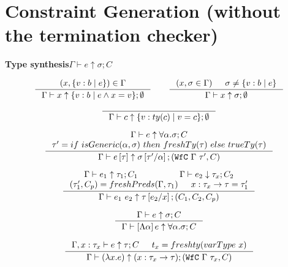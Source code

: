 \renewcommand\hastype[4]{\ensuremath{#1 \vdash #2 \uparrow #3 ; #4}}
\newcommand\checktype[4]{\ensuremath{#1 \vdash #2 \downarrow #3 ; #4}}
\newcommand\hastypealt[5]{\ensuremath{#1 ; #2 \downarrow #3 \colon #4 ; #5}}
\newcommand\ty[1]{\ensuremath{ty(#1)}}


\section*{Constraint Generation (without the termination checker)}

\hfill\textbf{Type synthesis}\qquad\mbox{\hastype{\Gamma}{e}{\sigma}{C}}


$$
\inference{
	(x, \tref{v}{b}{e}) \in \Gamma
}{
	\hastype{\Gamma}{x}{\tref{v}{b}{e \land x = v}}{\emptyset}
}
\qquad
\inference{
	(x, \sigma \in \Gamma) &&
	\sigma \neq \tref{v}{b}{e}
}{
	\hastype{\Gamma}{x}{\sigma}{\emptyset}
}
$$

$$
\inference{
}{
	\hastype{\Gamma}{c}{\tref{v}{\ty{c}}{v = c}}{\emptyset}
}
$$

\newcommand\wfc[2]{\ensuremath{\texttt{WfC}\ #1 \ #2}}
\newcommand\subc[3]{\ensuremath{\texttt{SubC}\ #1 \ #2\ #3}}
\newcommand\freshty[1]{\ensuremath{freshTy(#1)}}
\newcommand\truety[1]{\ensuremath{trueTy(#1)}}
\newcommand\truetyExpr[1]{\ensuremath{trueTyExpr(#1)}}
\newcommand\isGenericty[2]{\ensuremath{isGeneric(#1, #2)}}
\newcommand\freshPredsty[1]{\ensuremath{freshPreds(\Gamma, #1)}}
\newcommand\varTemplate[1]{\ensuremath{varTemplate(#1)}}
\newcommand\dataconty[2]{\ensuremath{dataConTy(#1, #2)}}

$$
\inference{
	\hastype{\Gamma}{e}{\tall{\alpha}{\sigma}}{C} \\
	\tau' = if\ \isGenericty{\alpha}{\sigma}\ then\ \freshty{\tau}\ else\ \truety{\tau}
}{
	\hastype{\Gamma}{\etapp{e}{\tau}}{\sigma\sub{\alpha}{\tau'}}{(\wfc{\Gamma}{\tau'}, C)}
}
$$

$$
\inference{
	\hastype{\Gamma}{e_1}{\tau_1}{C_1} &&
	\checktype{\Gamma}{e_2}{\tau_x}{C_2} &&\\
	(\tau_1', C_p) = \freshPredsty{\tau_1} &&
	\tfun{x}{\tau_x}{\tau} = \tau_1'
}{
	\hastype{\Gamma}{\eapp{e_1}{e_2}}{\tau\sub{x}{e_2}}
			{(C_1, C_2, C_p)}
}
$$


$$
\inference{
	\hastype{\Gamma}{e}{\sigma}{C}
}{
	\hastype{\Gamma}{\etabs{\alpha}{e}}{\tall{\alpha}{\sigma}}{C}
}
$$

$$
\inference{
	\hastype{\Gamma, x : \tau_x}{e}{\tau}{C} &&
	t_x = freshty(varType\ x)
}{
	\hastype{\Gamma}{(\efun{x}{}{e})}{(\tfun{x}{\tau_x}{\tau})}{(\wfc{\Gamma}{\tau_x}, C)}
}
$$

